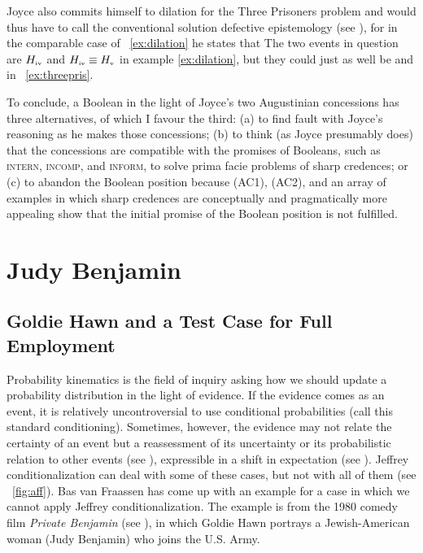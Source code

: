 \documentclass[phd,12pt,oneside]{ubcthesis}
\begin{document}
Joyce also commits himself to dilation for the Three Prisoners problem
and would thus have to call the conventional solution defective
epistemology (see ), for in the comparable case
of {\xample}~\ref{ex:dilation} he states that   The two events
in question are $H_{\mbox{\tiny{iv}}}$ and
$H_{\mbox{\tiny{iv}}}\equiv{}H_{\mbox{\tiny{v}}}$ in example
\ref{ex:dilation}, but they could just as well be  and  in
{\xample}~\ref{ex:threepris}.

To conclude, a Boolean in the light of Joyce's two Augustinian
concessions has three alternatives, of which I favour the third: (a)
to find fault with Joyce's reasoning as he makes those concessions;
(b) to think (as Joyce presumably does) that the concessions are
compatible with the promises of Booleans, such as \textsc{intern},
\textsc{incomp}, and \textsc{inform}, to solve prima facie problems of
sharp credences; or (c) to abandon the Boolean position because (AC1),
(AC2), and an array of examples in which sharp credences are
conceptually and pragmatically more appealing show that the initial
promise of the Boolean position is not fulfilled.

\chapter{Judy Benjamin}
\label{chp:eeyijeen}

\section{Goldie Hawn and a Test Case for Full Employment}
\label{sec:shutepae}

Probability kinematics is the field of inquiry asking how we should
update a probability distribution in the light of evidence. If the
evidence comes as an event, it is relatively uncontroversial to use
conditional probabilities (call this standard conditioning).
Sometimes, however, the evidence may not relate the certainty of an
event but a reassessment of its uncertainty or its probabilistic
relation to other events (see ),
expressible in a shift in expectation (see ).
Jeffrey conditionalization can deal with some of these cases, but not
with all of them (see {\igure}~\ref{fig:aff}). Bas van Fraassen has come
up with an example for a case in which we cannot apply Jeffrey
conditionalization. The example is from the 1980 comedy film
\emph{Private Benjamin} (see ), in
which Goldie Hawn portrays a Jewish-American woman (Judy Benjamin) who
joins the U.S. Army.
\end{document}

